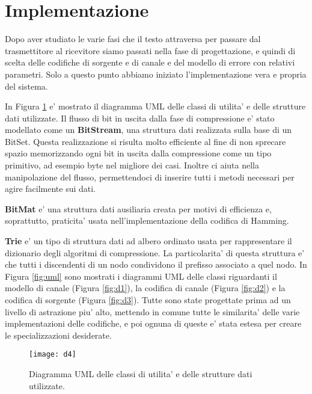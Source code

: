 \documentclass[a4paper,11pt]{article}
\theoremstyle{definition}
\begin{document}
\clearpage

\section{Implementazione}

Dopo aver studiato le varie fasi che il testo attraversa per passare dal trasmettitore al ricevitore siamo passati nella fase di progettazione, e quindi di scelta delle codifiche di sorgente e di canale e del modello di errore con relativi parametri. Solo a questo punto abbiamo iniziato l'implementazione vera e propria del sistema. 

In Figura \ref{fig:d4} e' mostrato il diagramma UML delle classi di utilita' e delle strutture dati utilizzate. Il flusso di bit in uscita dalla fase di compressione e' stato modellato come un \textbf{BitStream}, una struttura dati realizzata sulla base di un BitSet. Questa realizzazione si risulta molto efficiente al fine di non sprecare spazio memorizzando ogni bit in uscita dalla compressione come un tipo primitivo, ad esempio byte nel migliore dei casi. Inoltre ci aiuta nella manipolazione del flusso, permettendoci di inserire tutti i metodi necessari per agire facilmente sui dati.

\textbf{BitMat} e' una struttura dati ausiliaria creata per motivi di efficienza e, soprattutto, praticita' usata nell'implementazione della codifica di Hamming.

\textbf{Trie} e' un tipo di struttura dati ad albero ordinato usata per rappresentare il dizionario degli algoritmi di compressione. La particolarita' di questa struttura e' che tutti i discendenti di un nodo condividono il prefisso associato a quel nodo.
\newline\newline
\noindent In Figura \ref{fig:uml} sono mostrati i diagrammi UML delle classi riguardanti il modello di canale (Figura \ref{fig:d1}), la codifica di canale (Figura \ref{fig:d2}) e la codifica di sorgente (Figura \ref{fig:d3}). Tutte sono state progettate prima ad un livello di astrazione piu' alto, mettendo in comune tutte le similarita' delle varie implementazioni delle codifiche, e poi ognuna di queste e' stata estesa per creare le specializzazioni desiderate.

\begin{figure}
	\centering
	\texttt{[image: d4]}
	\caption{Diagramma UML delle classi di utilita' e delle strutture dati utilizzate. }
	\label{fig:d4}
\end{figure}
\end{document}
